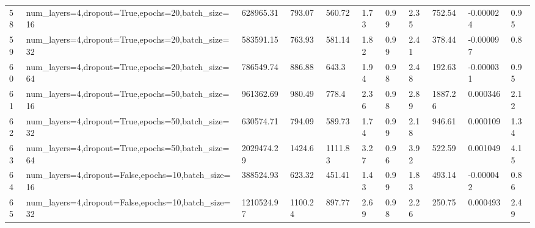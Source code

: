 \begin{longtable}{C{0.8cm} L{2cm} C{1.15cm} C{1.15cm} C{1.15cm} C{1.15cm} C{0.85cm} C{1.25cm} C{1.2cm} C{1.5cm} C{1.0cm}}
58 & num\_layers=4,\newline dropout=True,\newline epochs=20,\newline batch\_size=16 & 628965.31 & 793.07 & 560.72 & 1.73 & 0.99 & 2.35 & 752.54 & -0.000024 & 0.95 \\
59 & num\_layers=4,\newline dropout=True,\newline epochs=20,\newline batch\_size=32 & 583591.15 & 763.93 & 581.14 & 1.82 & 0.99 & 2.41 & 378.44 & -0.000097 & 0.8 \\
60 & num\_layers=4,\newline dropout=True,\newline epochs=20,\newline batch\_size=64 & 786549.74 & 886.88 & 643.3 & 1.94 & 0.98 & 2.48 & 192.63 & -0.000031 & 0.95 \\
61 & num\_layers=4,\newline dropout=True,\newline epochs=50,\newline batch\_size=16 & 961362.69 & 980.49 & 778.4 & 2.36 & 0.98 & 2.89 & 1887.26 & 0.000346 & 2.12 \\
62 & num\_layers=4,\newline dropout=True,\newline epochs=50,\newline batch\_size=32 & 630574.71 & 794.09 & 589.73 & 1.74 & 0.99 & 2.18 & 946.61 & 0.000109 & 1.34 \\
63 & num\_layers=4,\newline dropout=True,\newline epochs=50,\newline batch\_size=64 & 2029474.29 & 1424.6 & 1111.83 & 3.27 & 0.96 & 3.92 & 522.59 & 0.001049 & 4.15 \\
64 & num\_layers=4,\newline dropout=False,\newline epochs=10,\newline batch\_size=16 & 388524.93 & 623.32 & 451.41 & 1.43 & 0.99 & 1.83 & 493.14 & -0.000042 & 0.86 \\
65 & num\_layers=4,\newline dropout=False,\newline epochs=10,\newline batch\_size=32 & 1210524.97 & 1100.24 & 897.77 & 2.69 & 0.98 & 2.26 & 250.75 & 0.000493 & 2.49 \\

\end{longtable}
